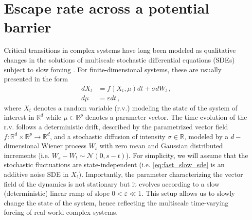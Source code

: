 \documentclass[a4paper,fleqn]{cas-sc}
\begin{document}
\section{Escape rate across a potential barrier}\label{sec:escape_rate}
Critical transitions in complex systems have long been modeled as qualitative changes in the solutions of multiscale stochastic differential equations (SDEs) subject to slow forcing \cite{Kuehn2011}.
For finite-dimensional systems, these are usually presented in the form
%
\begin{equation}
        \begin{aligned}\label{eq:fast_slow_sde}
                dX_{t} &= f(X_{t},\mu)dt + \sigma dW_{t}\,,\\
                d\mu &= \varepsilon dt\,,
        \end{aligned}
\end{equation}
%
where $X_t$ denotes a random variable (r.v.) modeling the state of the system of interest in $\mathbb{R}^{d}$ while $\mu\in \mathbb{R}^{p}$ denotes a parameter vector.
The time evolution of the r.v. follows a deterministic drift, described by the parametrized vector field $f:\mathbb{R}^{d}\times \mathbb{R}^{p}\to \mathbb{R}^{d}$, and a stochastic diffusion of intensity $\sigma\in\mathbb{R}$, modeled by a $d-$dimensional Wiener process $W_{t}$ with zero mean and Gaussian distributed increments (i.e. $W_{s} - W_{t}\sim\mathcal{N}(0,s-t)$).
For simplicity, we will assume that the stochastic fluctuations are state-independent (i.e. \eqref{eq:fast_slow_sde} is an additive noise SDE in $X_t$).
Importantly, the parameter characterizing the vector field of the dynamics is not stationary but it evolves according to a slow (deterministic) linear ramp of slope $0 < \varepsilon \ll 1$.
This setup allows us to slowly change the state of the system, hence reflecting the multiscale time-varying forcing of real-world complex systems.
\end{document}
